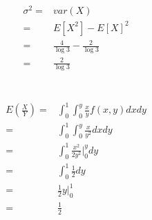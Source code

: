 \documentclass{article}
\begin{document}
            \begin{equation*}
                \begin{split}
                    \sigma^2=&var(X)\\
                        =&E[X^2]-E[X]^2\\
                        =&\frac{4}{\log 3}-\frac{2}{\log 3}\\
                        =&\frac{2}{\log 3}
                \end{split}
            \end{equation*}

    \section{}
        \begin{equation*}
            \begin{split}
                E(\frac{X}{Y})=&\int _0 ^1 \int _0 ^y \frac{x}{y}f(x,y) dx dy\\
                    =&\int _0 ^1 \int _0 ^y \frac{x}{y^2} dx dy\\
                    =&\int _0 ^1 \frac{x^2}{2y^2}|_0 ^y dy \\
                    =&\int _0 ^1 \frac{1}{2} dy\\
                    =& \frac{1}{2} y | _0 ^1 \\
                    =& \frac{1}{2} 
            \end{split}
        \end{equation*}
            
    \section{}
\end{document}
